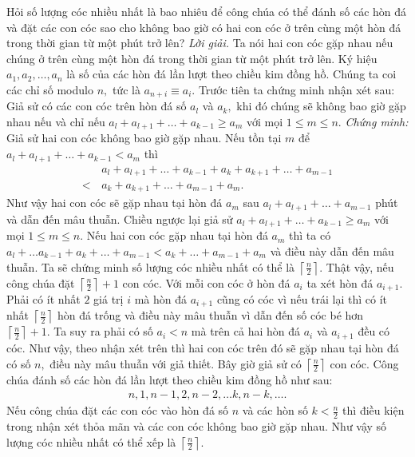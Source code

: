 \begin{multicols}{2}
	\vskip 0.1cm
	Hỏi số lượng cóc nhiều nhất là bao nhiêu để công chúa có thể đánh số các hòn đá và đặt các con cóc sao cho không bao giờ có hai con cóc ở trên cùng một hòn đá trong thời gian từ một phút trở lên?
	\vskip 0.1cm
	\textit{Lời giải.}
	Ta nói hai con cóc gặp nhau nếu chúng ở trên cùng một hòn đá trong thời gian từ một phút trở lên. Ký hiệu $a_1, a_2, \dots, a_n$ là số của các hòn đá lần lượt theo chiều kim đồng hồ. Chúng ta coi các chỉ số modulo $n,$ tức là $a_{n+i}\equiv a_i.$ 
	\vskip 0.05cm
	Trước tiên ta chứng minh nhận xét sau: Giả sử có các con cóc trên hòn đá số $a_l$ và $a_k,$ khi đó chúng sẽ không bao giờ gặp nhau nếu và chỉ nếu $a_l+a_{l+1}+\dots+a_{k-1}\ge a_m $ với mọi $1\le m\le n.$
	\vskip 0.05cm
	{\it Chứng minh:} Giả sử hai con cóc không bao giờ gặp nhau. Nếu tồn tại $m$ để $a_l+a_{l+1}+\dots+a_{k-1}< a_m $ thì 
	\begin{align*}
		&a_l\!+\!a_{l\!+\!1}\!+\!\dots\!+\!a_{k\!-\!1}\!+\!a_k\!+\! a_{k\!+\!1}\!+\!\dots \!+\!a_{m\!-\!1} \\
		<\, &a_k\!+\! a_{k\!+\!1}\!+\!\dots \!+\!a_{m\!-\!1}\!+\!a_m.
	\end{align*} 
	Như vậy hai con cóc sẽ gặp nhau tại hòn đá $a_m$ sau $a_l+a_{l+1}+\dots+a_{m-1}$ phút và dẫn đến mâu thuẫn. 
	\vskip 0.05cm
	Chiều ngược lại giả sử $a_l+a_{l+1}+\dots+a_{k-1}\ge a_m $ với mọi $1\le m\le n.$ Nếu hai con cóc gặp nhau tại hòn đá $a_m$ thì ta có $a_l+\dots a_{k-1}+a_k+\dots +a_{m-1} < a_k+\dots +a_{m-1}+a_m$ và điều này dẫn đến mâu thuẫn. 
	\vskip 0.05cm
	Ta sẽ chứng minh số lượng cóc nhiều nhất có thể là $ \left\lceil \frac{n}{2} \right\rceil.$ Thật vậy, nếu công chúa đặt $ \left\lceil \frac{n}{2} \right\rceil+1$ con cóc. Với mỗi con cóc ở hòn đá $a_i$ ta xét hòn đá $a_{i+1}.$ Phải có ít nhất $2$ giá trị $i$ mà hòn đá $a_{i+1}$ cũng có cóc vì nếu trái lại thì có ít nhất $ \left\lceil \frac{n}{2} \right\rceil$ hòn đá trống và điều này mâu thuẫn vì dẫn đến số cóc bé hơn $\left\lceil \frac{n}{2} \right\rceil+1.$ Ta suy ra phải có số $a_i<n$ mà trên cả hai hòn đá $a_i$ và $a_{i+1}$ đều có cóc. Như vậy, theo nhận xét trên thì hai con cóc trên đó sẽ gặp nhau tại hòn đá có số $n,$ điều này mâu thuẫn với giả thiết.
	\vskip 0.1cm
	Bây giờ giả sử có $ \left\lceil \frac{n}{2} \right\rceil$ con cóc. Công chúa đánh số các hòn đá lần lượt theo chiều kim đồng hồ như sau:
	\begin{align*}
		n, 1, n-1, 2, n-2, \dots k, n-k, \dots.
	\end{align*}
	Nếu công chúa đặt các con cóc vào hòn đá số $n$ và các hòn số $k<\frac{n}{2}$ thì điều kiện trong nhận xét thỏa mãn và các con cóc không bao giờ gặp nhau. Như vậy số lượng cóc nhiều nhất có thể xếp là $ \left\lceil \frac{n}{2} \right\rceil.$

\end{multicols}
